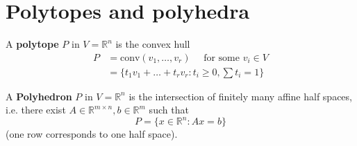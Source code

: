 \documentclass[a4paper,12pt]{amsart}
\begin{document}
\newpage
\section{Polytopes and polyhedra}

\begin{Def}
	A {\bf polytope} $P$ in $V= \mathbb{R}^n$ is the convex hull 
	\begin{align*}
		P&= \text{conv}(v_1, \ldots, v_r) \quad \text{ for some } v_i \in V\\
		&= \{t_1v_1 + \ldots + t_r v_r : t_i \geq 0, \sum t_i = 1\}
	\end{align*}
\end{Def}

\begin{Def}
	A {\bf Polyhedron} $P$ in $V=\mathbb{R}^n$ is the intersection of finitely many affine half spaces, i.e. there exist $A\in\mathbb{R}^{m\times n}, b \in \mathbb{R}^m$ such that
	\[ P = \{x \in \mathbb{R}^n : Ax=b\}\]
	(one row corresponds to one half space).
\end{Def}
\end{document}
